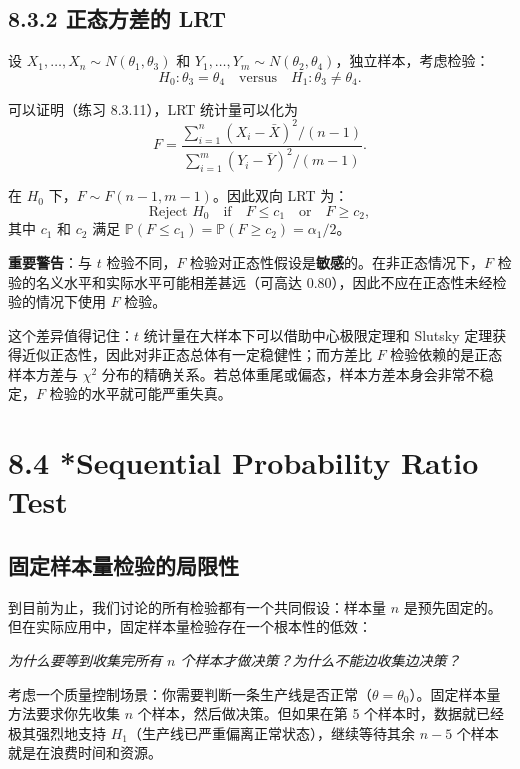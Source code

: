 \subsection{8.3.2 正态方差的 LRT}\label{sec:8.3.2}

\begin{example}[两方差相等的 F 检验]\label{ex:f-test-variance}
设 $X_1, \ldots, X_n \sim N(\theta_1, \theta_3)$ 和 $Y_1, \ldots, Y_m \sim N(\theta_2, \theta_4)$，独立样本，考虑检验：
\[
H_0: \theta_3 = \theta_4 \quad \text{versus} \quad H_1: \theta_3 \neq \theta_4.
\]

可以证明（练习 8.3.11），LRT 统计量可以化为
\[
F = \frac{\sum_{i=1}^n (X_i - \bar{X})^2 / (n-1)}{\sum_{i=1}^m (Y_i - \bar{Y})^2 / (m-1)}. \label{eq:f-statistic-variance}
\]

在 $H_0$ 下，$F \sim F(n-1, m-1)$。因此双向 LRT 为：
\[
\text{Reject } H_0 \quad \text{if} \quad F \leq c_1 \quad \text{or} \quad F \geq c_2,
\]
其中 $c_1$ 和 $c_2$ 满足 $\mathbb{P}(F \leq c_1) = \mathbb{P}(F \geq c_2) = \alpha_1/2$。

\textbf{重要警告}：与 $t$ 检验不同，$F$ 检验对正态性假设是\textbf{敏感}的。在非正态情况下，$F$ 检验的名义水平和实际水平可能相差甚远（可高达 $0.80$），因此不应在正态性未经检验的情况下使用 $F$ 检验。

这个差异值得记住：$t$ 统计量在大样本下可以借助中心极限定理和 Slutsky 定理获得近似正态性，因此对非正态总体有一定稳健性；而方差比 $F$ 检验依赖的是正态样本方差与 $\chi^2$ 分布的精确关系。若总体重尾或偏态，样本方差本身会非常不稳定，$F$ 检验的水平就可能严重失真。\end{example}

\section{8.4 *Sequential Probability Ratio Test}\label{sec:8.4}

\subsection{固定样本量检验的局限性}

到目前为止，我们讨论的所有检验都有一个共同假设：样本量 $n$ 是预先固定的。但在实际应用中，固定样本量检验存在一个根本性的低效：

\begin{center}
\textit{为什么要等到收集完所有 $n$ 个样本才做决策？为什么不能边收集边决策？}
\end{center}

考虑一个质量控制场景：你需要判断一条生产线是否正常（$\theta = \theta_0$）。固定样本量方法要求你先收集 $n$ 个样本，然后做决策。但如果在第 5 个样本时，数据就已经极其强烈地支持 $H_1$（生产线已严重偏离正常状态），继续等待其余 $n-5$ 个样本就是在浪费时间和资源。

